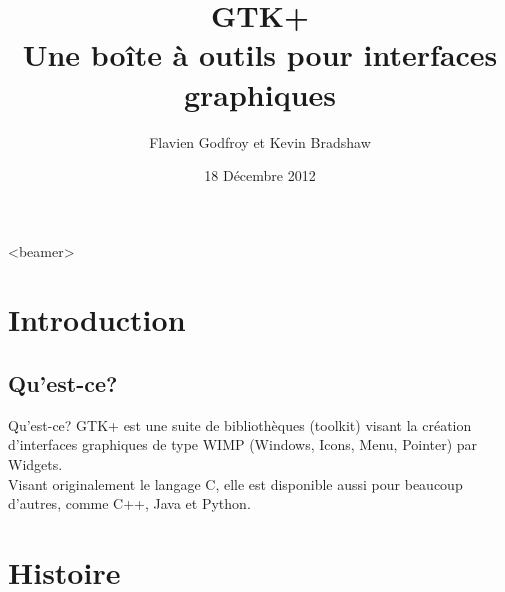 \documentclass{beamer}
\title[GTK+]{GTK+\\Une boîte à outils pour interfaces graphiques}
\author{Flavien Godfroy et Kevin Bradshaw}
\date{18 Décembre 2012}
\begin{document}
  \begin{frame}
    \titlepage
  \end{frame}

  \begin{frame}<beamer>
      \frametitle{}
      \tableofcontents
    \end{frame}


  \section{Introduction}

  \subsection{Qu'est-ce?}
    \begin{frame}{Qu'est-ce?}
    GTK+ est une suite de bibliothèques (toolkit) visant la création d'interfaces graphiques de type WIMP (Windows, Icons, Menu, Pointer) par Widgets.\\
    Visant originalement le langage C, elle est disponible aussi pour beaucoup d'autres, comme C++, Java et Python.
  \end{frame}


  \section{Histoire}
\end{document}
